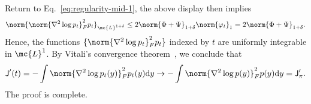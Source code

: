 \documentclass[11pt]{article}
\newcommand{\de}{\mathrm{d}}
\newcommand{\jfunc}{\mathsf{J}}
\begin{document}
Return to Eq.~\eqref{eq:regularity-mid-1}, the above display then implies
\begin{align*}
    \norm{\norm{\nabla^2 \log p_t}_F^2 p_t}_{\mc{L}^{1+\delta}} \leq 2 \norm{\Phi + \Psi}_{1+\delta} \norm{\varphi_t}_1 = 2 \norm{\Phi + \Psi}_{1+\delta}.
\end{align*}
Hence, the functions $\{\norm{\nabla^2 \log p_t}_F^2 p_t\}$ indexed by $t$ are uniformly integrable in $\mc{L}^1$. By Vitali's convergence theorem~\citep[Thm.~16.14]{billingsley1995probability}, we conclude that
\begin{align*}
    \jfunc'(t) =-\int \norm{\nabla^2 \log p_t(y)}_F^2 p_t(y) \de y \to -\int \norm{\nabla^2 \log p(y)}_F^2 p(y) \de y = \jfunc_{\pi}'.
\end{align*}
The proof is complete.
\end{document}
